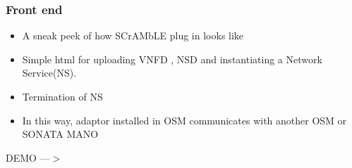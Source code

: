 \begin{frame}
\frametitle{Front end}

\begin{itemize}
			\item A sneak peek of how SCrAMbLE plug in looks like 
			
	\item Simple html for uploading VNFD , NSD and instantiating a Network Service(NS). 
	
	\item Termination of NS 
		
	\item In this way, adaptor installed in OSM communicates with another OSM or SONATA MANO
\end{itemize}
\end{frame}
\begin{frame}
\Huge{\centerline{DEMO ---$ > $}}

\end{frame}